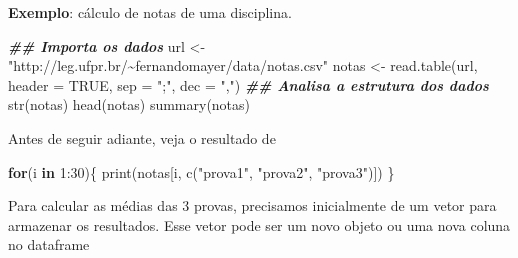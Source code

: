 \documentclass[
  10pt,
  a4paper]{book}
\newenvironment{Shaded}{\begin{snugshade}}{\end{snugshade}}
\newcommand{\AttributeTok}[1]{\textcolor[rgb]{0.77,0.63,0.00}{#1}}
\newcommand{\ConstantTok}[1]{\textcolor[rgb]{0.00,0.00,0.00}{#1}}
\newcommand{\ControlFlowTok}[1]{\textcolor[rgb]{0.13,0.29,0.53}{\textbf{#1}}}
\newcommand{\DecValTok}[1]{\textcolor[rgb]{0.00,0.00,0.81}{#1}}
\newcommand{\DocumentationTok}[1]{\textcolor[rgb]{0.56,0.35,0.01}{\textbf{\textit{#1}}}}
\newcommand{\FunctionTok}[1]{\textcolor[rgb]{0.00,0.00,0.00}{#1}}
\newcommand{\NormalTok}[1]{#1}
\newcommand{\OtherTok}[1]{\textcolor[rgb]{0.56,0.35,0.01}{#1}}
\newcommand{\SpecialCharTok}[1]{\textcolor[rgb]{0.00,0.00,0.00}{#1}}
\newcommand{\StringTok}[1]{\textcolor[rgb]{0.31,0.60,0.02}{#1}}
\begin{document}
\textbf{Exemplo}: cálculo de notas de uma disciplina.

\begin{Shaded}
\begin{Highlighting}[]
\DocumentationTok{\#\# Importa os dados}
\NormalTok{url }\OtherTok{\textless{}{-}} \StringTok{"http://leg.ufpr.br/\textasciitilde{}fernandomayer/data/notas.csv"}
\NormalTok{notas }\OtherTok{\textless{}{-}} \FunctionTok{read.table}\NormalTok{(url, }\AttributeTok{header =} \ConstantTok{TRUE}\NormalTok{, }\AttributeTok{sep =} \StringTok{";"}\NormalTok{, }\AttributeTok{dec =} \StringTok{","}\NormalTok{)}
\DocumentationTok{\#\# Analisa a estrutura dos dados}
\FunctionTok{str}\NormalTok{(notas)}
\FunctionTok{head}\NormalTok{(notas)}
\FunctionTok{summary}\NormalTok{(notas)}
\end{Highlighting}
\end{Shaded}

Antes de seguir adiante, veja o resultado de

\begin{Shaded}
\begin{Highlighting}[]
\ControlFlowTok{for}\NormalTok{(i }\ControlFlowTok{in} \DecValTok{1}\SpecialCharTok{:}\DecValTok{30}\NormalTok{)\{}
    \FunctionTok{print}\NormalTok{(notas[i, }\FunctionTok{c}\NormalTok{(}\StringTok{"prova1"}\NormalTok{, }\StringTok{"prova2"}\NormalTok{, }\StringTok{"prova3"}\NormalTok{)])}
\NormalTok{\}}
\end{Highlighting}
\end{Shaded}

Para calcular as médias das 3 provas, precisamos inicialmente de um
vetor para armazenar os resultados. Esse vetor pode ser um novo objeto
ou uma nova coluna no dataframe
\end{document}

